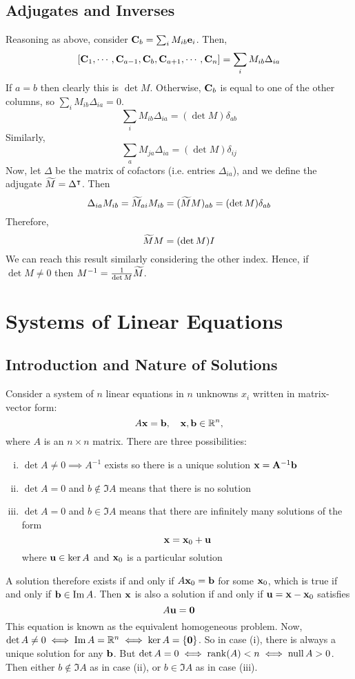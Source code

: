 \documentclass{article}
\begin{document}
\subsection{Adjugates and Inverses}
Reasoning as above, consider $\vb C_b = \sum_i M_{ib} \vb e_i$. Then,
\[ [\vb C_1, \cdots, \vb C_{a-1}, \vb C_b, \vb C_{a+1}, \cdots, \vb C_n ] = \sum_i M_{ib} \Delta_{ia} \]
If $a=b$ then clearly this is $\det M$. Otherwise, $\vb C_b$ is equal to one of the other columns, so $\sum_i M_{ib} \Delta_{ia} = 0$.
\[ \sum_i M_{ib} \Delta_{ia} = (\det M)\delta_{ab} \]
Similarly,
\[ \sum_a M_{ja} \Delta_{ia} = (\det M)\delta_{ij} \]
Now, let $\Delta$ be the matrix of cofactors (i.e. entries $\Delta_{ia}$), and we define the adjugate $\widetilde{M} = \Delta^\intercal$. Then
\[ \Delta_{ia}M_{ib} = \widetilde{M}_{ai}M_{ib} = (\widetilde{M} M)_{ab} = (\det M)\delta_{ab} \]
Therefore,
\[ \widetilde{M} M = (\det M) I \]
We can reach this result similarly considering the other index. Hence, if $\det M \neq 0$ then $M^{-1} = \frac{1}{\det M}\widetilde{M}$.

\section{Systems of Linear Equations}
\subsection{Introduction and Nature of Solutions}
Consider a system of $n$ linear equations in $n$ unknowns $x_i$ written in matrix-vector form:
\[ A\vb x = \vb b,\quad \vb x, \vb b \in \mathbb R^n, \]
where $A$ is an $n \times n$ matrix. There are three possibilities:
\begin{enumerate}[(i)]
    \item $\det A \neq 0 \implies A^{-1}$ exists so there is a unique solution $\vb x = \vb A^{-1} \vb b$
    \item $\det A = 0$ and $b \notin \Im A$ means that there is no solution
    \item $\det A = 0$ and $b \in \Im A$ means that there are infinitely many solutions of the form
          \[ \vb x = \vb x_0 + \vb u \]
          where $\vb u \in \ker A$ and $\vb x_0$ is a particular solution
\end{enumerate}
A solution therefore exists if and only if $A\vb x_0 = \vb b$ for some $\vb x_0$, which is true if and only if $\vb b \in \Im A$. Then $\vb x$ is also a solution if and only if $\vb u = \vb x - \vb x_0$ satisfies
\[ A\vb u = \vb 0 \]
This equation is known as the equivalent homogeneous problem. Now, $\det A \neq 0 \iff \Im A = \mathbb R^n \iff \ker A = \{ \vb 0 \}$. So in case (i), there is always a unique solution for any $\vb b$. But $\det A = 0 \iff \rank(A) < n \iff \operatorname{null} A > 0$. Then either $b \notin \Im A$ as in case (ii), or $b \in \Im A$ as in case (iii).
\end{document}
